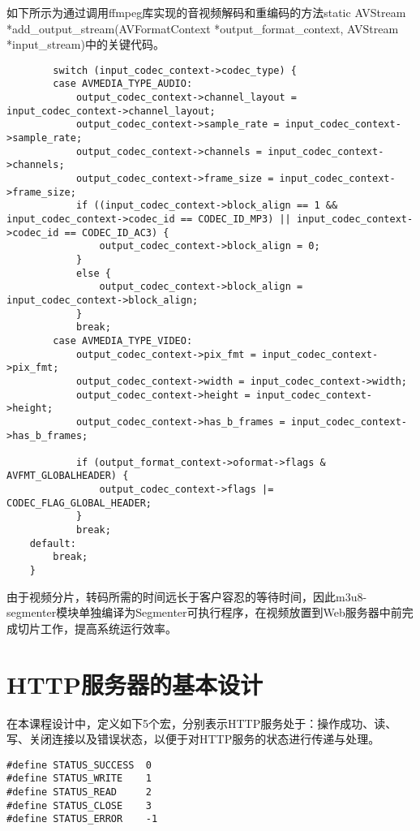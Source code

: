 \documentclass[bachelor]{thesis-uestc}
\begin{document}
如下所示为通过调用ffmpeg库实现的音视频解码和重编码的方法static AVStream *add\_output\_stream(AVFormatContext *output\_format\_context, AVStream *input\_stream)中的关键代码。
\begin{lstlisting}
	    switch (input_codec_context->codec_type) {
        case AVMEDIA_TYPE_AUDIO:
            output_codec_context->channel_layout = input_codec_context->channel_layout;
            output_codec_context->sample_rate = input_codec_context->sample_rate;
            output_codec_context->channels = input_codec_context->channels;
            output_codec_context->frame_size = input_codec_context->frame_size;
            if ((input_codec_context->block_align == 1 && input_codec_context->codec_id == CODEC_ID_MP3) || input_codec_context->codec_id == CODEC_ID_AC3) {
                output_codec_context->block_align = 0;
            }
            else {
                output_codec_context->block_align = input_codec_context->block_align;
            }
            break;
        case AVMEDIA_TYPE_VIDEO:
            output_codec_context->pix_fmt = input_codec_context->pix_fmt;
            output_codec_context->width = input_codec_context->width;
            output_codec_context->height = input_codec_context->height;
            output_codec_context->has_b_frames = input_codec_context->has_b_frames;

            if (output_format_context->oformat->flags & AVFMT_GLOBALHEADER) {
                output_codec_context->flags |= CODEC_FLAG_GLOBAL_HEADER;
            }
            break;
    default:
        break;
    }
\end{lstlisting}

由于视频分片，转码所需的时间远长于客户容忍的等待时间，因此m3u8-segmenter模块单独编译为Segmenter可执行程序，在视频放置到Web服务器中前完成切片工作，提高系统运行效率。

\section{HTTP服务器的基本设计}
在本课程设计中，定义如下5个宏，分别表示HTTP服务处于：操作成功、读、写、关闭连接以及错误状态，以便于对HTTP服务的状态进行传递与处理。
\begin{lstlisting}
#define STATUS_SUCCESS	0
#define STATUS_WRITE	1
#define STATUS_READ		2
#define STATUS_CLOSE	3
#define STATUS_ERROR	-1
\end{lstlisting}
\end{document}
